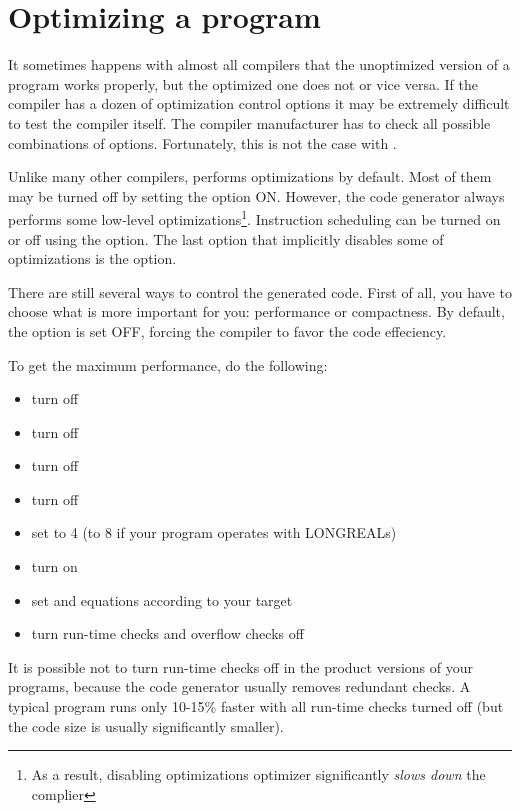 \ifgencode
\chapter{Optimizing a program}\label{optimize}


It sometimes happens with almost all compilers that the unoptimized
version of a program works properly, but the optimized one does not or vice versa.
If the compiler has a dozen of optimization control options it may be extremely
difficult to test the compiler itself. The compiler manufacturer has to
check all possible combinations of options. Fortunately, this
is not the case with \XDS{}.

Unlike many other compilers, \XDS{} performs optimizations by default.
Most of them may be turned off by setting the  option ON.
However, the code generator always performs some low-level
optimizations\footnote{As a result, disabling optimizations
optimizer significantly {\em slows down} the complier}.
Instruction scheduling can be turned on or off using the 
option. The last option that implicitly disables some of optimizations
is the  option.

There are still several ways to control the generated code.
First of all, you have to choose what is more important for you: performance
or compactness. By default, the option  is set OFF,
forcing the compiler to favor the code effeciency.

To get the maximum performance, do the following:
\begin{itemize}
\item turn  off
\item turn  off            %
\item turn  off
\item turn  off
\iflinux \else %
\item set  to 4 (to 8 if your program operates with LONGREALs)
\fi
\item turn  on
\item set  and  equations according to your
      target
\item turn run-time checks and overflow checks off
\end{itemize}
It is possible not to turn run-time checks off in the product versions
of your programs, because the code generator usually removes redundant
checks. A typical program runs only 10-15\% faster with all run-time
checks turned off (but the code size is usually significantly smaller).

